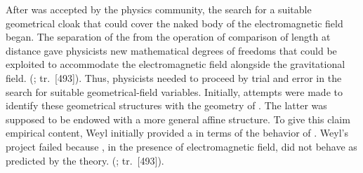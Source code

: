 \documentclass[draft]{article}
\newcommand{\phin}{\ensuremath{\varphi_\nu}\xspace}
\newcommand{\WG}{Weyl's geometry\xspace}
\renewcommand{\rzlap}[2]{(\cite[#1]{Reichenbach1928}; tr.\ [#2])\xspace}
\begin{document}
After \gr was accepted by the physics community, the search for a suitable geometrical cloak that could cover the naked body of the electromagnetic field began. The separation of the  \Gtmn from the operation of comparison of length at distance \gmn gave physicists new mathematical degrees of freedoms that could be exploited to accommodate the electromagnetic field alongside the gravitational field.  \rzlap{354}{493}. Thus, physicists needed to proceed by trial and error in the search for suitable geometrical-field variables. Initially, attempts were made to identify these geometrical structures with  the geometry of \spti. The latter was supposed to be endowed with a more general affine structure. To give this claim empirical content, Weyl initially provided a  in terms of the behavior of \rac. Weyl's project failed because \rac, in the presence of electromagnetic field, did not behave as predicted by the theory.   \rzlap{353}{493}.


\end{document}
